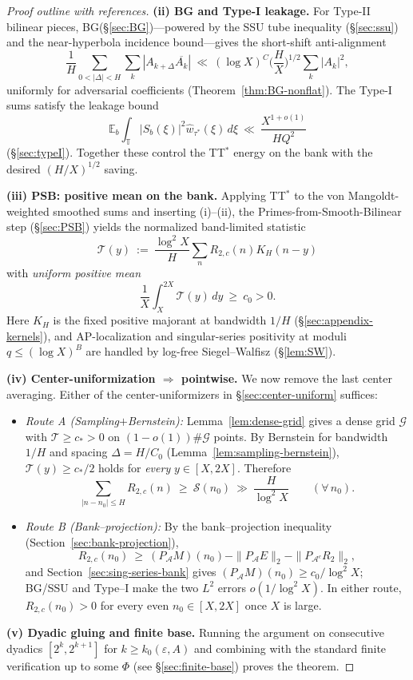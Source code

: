 \begin{proof}[Proof outline with references]
\smallskip
\noindent\textbf{(ii) BG and Type-I leakage.}
For Type-II bilinear pieces, BG(\S\ref{sec:BG})---powered by the SSU tube inequality (\S\ref{sec:ssu}) and the near-hyperbola incidence bound---gives the short-shift anti-alignment
\[
\frac{1}{H}\sum_{0<|\Delta|<H}\sum_k |A_{k+\Delta}\overline{A_k}|
\ \ll\ (\log X)^C\Big(\frac{H}{X}\Big)^{1/2}\sum_k|A_k|^2,
\]
uniformly for adversarial coefficients (Theorem~\ref{thm:BG-nonflat}). The Type-I sums satisfy the leakage bound
\[
\mathbb E_b \int_{\mathbb T}|S_b(\xi)|^2\widehat w_{\tau^\ast}(\xi)\,d\xi
\ \ll\ \frac{X^{1+o(1)}}{H Q^2}
\]
(\S\ref{sec:typeI}). Together these control the TT$^*$ energy on the bank with the desired $(H/X)^{1/2}$ saving.

\smallskip
\noindent\textbf{(iii) PSB: positive mean on the bank.}
Applying TT$^*$ to the von Mangoldt-weighted smoothed sums and inserting (i)--(ii), the Primes-from-Smooth-Bilinear step (\S\ref{sec:PSB}) yields the normalized band-limited statistic
\[
\mathcal T(y)\ :=\ \frac{\log^2 X}{H}\sum_n R_{2,c}(n)K_H(n-y)
\]
with \emph{uniform positive mean}
\[
\frac1X\int_X^{2X}\mathcal T(y)\,dy\ \ge\ c_0>0.
\]
Here $K_H$ is the fixed positive majorant at bandwidth $1/H$ (\S\ref{sec:appendix-kernels}), and AP-localization and singular-series positivity at moduli $q\le (\log X)^B$ are handled by log-free Siegel--Walfisz (\S\ref{lem:SW}).

\smallskip
\noindent\textbf{(iv) Center-uniformization $\Rightarrow$ pointwise.}
We now remove the last center averaging. Either of the center-uniformizers in \S\ref{sec:center-uniform} suffices:
\begin{itemize}
\item \emph{Route A (Sampling$+$Bernstein):} Lemma~\ref{lem:dense-grid} gives a dense grid $\mathcal G$ with $\mathcal T\ge c_*>0$ on $(1-o(1))\#\mathcal G$ points. By Bernstein for bandwidth $1/H$ and spacing $\Delta=H/C_0$ (Lemma~\ref{lem:sampling-bernstein}), $\mathcal T(y)\ge c_*/2$ holds for \emph{every} $y\in[X,2X]$. Therefore
\[
\sum_{|n-n_0|\le H} R_{2,c}(n)\ \ge\ \mathcal S(n_0)\ \gg\ \frac{H}{\log^2 X}\qquad(\forall\,n_0).
\]
\item \emph{Route B (Bank–projection):} By the bank–projection inequality (Section~\ref{sec:bank-projection}),
\[
R_{2,c}(n_0)\ \ge\ (P_{\mathcal A}M)(n_0)-\|P_{\mathcal A}E\|_2-\|P_{\mathcal A^c}R_2\|_2,
\]
and Section~\ref{sec:sing-series-bank} gives $(P_{\mathcal A}M)(n_0)\ge c_0/\log^2 X$; BG/SSU and Type–I make the two $L^2$ errors $o(1/\log^2 X)$.
In either route, $R_{2,c}(n_0)>0$ for every even $n_0\in[X,2X]$ once $X$ is large.
\end{itemize}

\smallskip
\noindent\textbf{(v) Dyadic gluing and finite base.}
Running the argument on consecutive dyadics $[2^k,2^{k+1}]$ for $k\ge k_0(\varepsilon,A)$ and combining with the standard finite verification up to some $\Phi$ (see \S\ref{sec:finite-base}) proves the theorem.
\end{proof}

